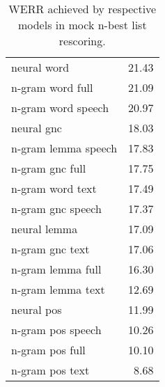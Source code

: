 \begin{table}[!htbp]
	\centering
	\caption[WERR achieved by respective models in mock \mbox{n-best} list rescoring]{WERR achieved by respective models in mock \mbox{n-best} list rescoring.}
	\label{table:max_werr}
	\begin{tabular*}{.4\linewidth}{@{\extracolsep{\fill}}lr}
		neural word   & 21.43\\
		n-gram word full  & 21.09\\
		n-gram word speech  & 20.97\\
		neural gnc    & 18.03\\
		n-gram lemma speech  & 17.83\\
		n-gram gnc full  & 17.75\\
		n-gram word text  & 17.49\\
		n-gram gnc speech  & 17.37\\
		neural lemma  & 17.09\\
		n-gram gnc text  & 17.06\\
		n-gram lemma full  & 16.30\\
		n-gram lemma text  & 12.69\\
		neural pos    & 11.99\\
		n-gram pos speech  & 10.26\\
		n-gram pos full  & 10.10\\
		n-gram pos text  & 8.68\\
	\end{tabular*}
\end{table}
